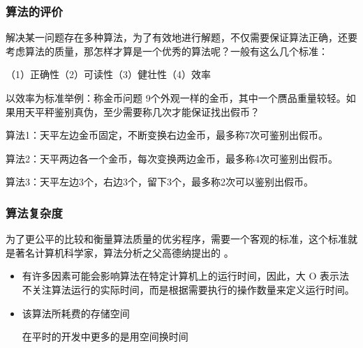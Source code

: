 \begin{frame}
    \frametitle{算法的评价}
    解决某一问题存在多种算法，为了有效地进行解题，不仅需要保证算法正确，还要考虑算法的质量，那怎样才算是一个优秀的算法呢？一般有这么几个标准：

  （1）正确性（2）可读性（3）健壮性（4）效率
  \bigskip

  \begin{block}{以效率为标准举例：称金币问题}
    9个外观一样的金币，其中一个赝品重量较轻。如果用天平秤鉴别真伪，至少需要称几次才能保证找出假币？
  \end{block}
    \pause

    算法1：天平左边金币固定，不断变换右边金币，最多称7次可鉴别出假币。

    算法2：天平两边各一个金币，每次变换两边金币，最多称4次可鉴别出假币。

    算法3：天平左边3个，右边3个，留下3个，最多称2次可以鉴别出假币。

\end{frame}

\begin{frame}
    \frametitle{算法复杂度}
    为了更公平的比较和衡量算法质量的优劣程序，需要一个客观的标准，这个标准就是著名计算机科学家，算法分析之父高德纳提出的 {}。
    \begin{itemize}
      \item {}
      
      有许多因素可能会影响算法在特定计算机上的运行时间，因此，大 O 表示法不关注算法运行的实际时间，而是根据需要执行的操作数量来定义运行时间。
      \item {}
      
      该算法所耗费的存储空间

      在平时的开发中更多的是用空间换时间
    \end{itemize}
\end{frame}


